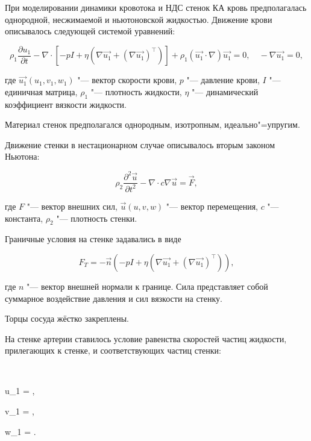 При моделировании динамики кровотока и НДС стенок КА кровь предполагалась однородной, несжимаемой и ньютоновской жидкостью. Движение крови  описывалось  следующей системой уравнений:

$$

\rho_1\frac{\partial {u_1}}{\partial t} - \nabla \cdot \left[-pI  + \eta \left(\nabla  \vec{u_1} + \left(\nabla\vec{u_1}\right)^\top\right)\right] + \rho_1 \left(\vec{u_1}\cdot \nabla\right)\vec{u_1} = 0,\quad  - \nabla \vec{u_1} = 0,

$$

где $\vec{u_1}\left(u_1,v_1,w_1\right)$ "--- вектор скорости крови, $p$ "--- давление крови, $I$ "--- единичная матрица, $\rho_1$ "--- плотность жидкости, $\eta$ "--- динамический коэффициент вязкости жидкости.



Материал стенок предполагался однородным, изотропным, идеально"=упругим.



Движение стенки в нестационарном случае описывалось вторым законом Ньютона:

$$

\rho_2 \frac{\partial^2 \vec{u}}{\partial t^2} - \nabla \cdot c \nabla \vec{u} = \vec{F},

$$

где $F$ "--- вектор внешних сил, $\vec{u}\left(u,v,w\right)$ "--- вектор перемещения, $c$ "--- константа, $\rho_2$ "--- плотность стенки. 



Граничные условия на стенке задавались в виде

$$

F_T = - \vec{n} \left(-pI + \eta \left(\nabla \vec{u_1} + \left(\nabla\vec{u_1}\right)^\top\right)\right),

$$

где $n$ "--- вектор внешней нормали к границе. Сила представляет собой суммарное воздействие давления и сил вязкости на стенку. 

Торцы сосуда жёстко закреплены. 



На стенке артерии ставилось условие равенства скоростей частиц жидкости, прилегающих к стенке, и соответствующих частиц стенки:

$$

u_1 = ,\quad 

v_1 = ,\quad 

w_1 = .

